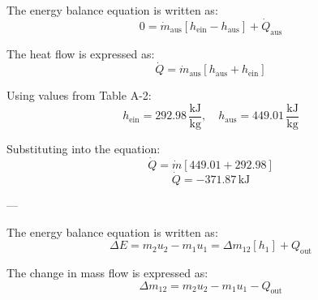 The energy balance equation is written as:  
\[
0 = \dot{m}_{\text{aus}} \left[ h_{\text{ein}} - h_{\text{aus}} \right] + \dot{Q}_{\text{aus}}
\]  

The heat flow is expressed as:  
\[
\dot{Q} = \dot{m}_{\text{aus}} \left[ h_{\text{aus}} + h_{\text{ein}} \right]
\]  

Using values from Table A-2:  
\[
h_{\text{ein}} = 292.98 \, \frac{\text{kJ}}{\text{kg}}, \quad h_{\text{aus}} = 449.01 \, \frac{\text{kJ}}{\text{kg}}
\]  

Substituting into the equation:  
\[
\dot{Q} = \dot{m} \left[ 449.01 + 292.98 \right]
\]  
\[
\dot{Q} = -371.87 \, \text{kJ}
\]  

---

The energy balance equation is written as:  
\[
\Delta E = m_2 u_2 - m_1 u_1 = \Delta m_{12} \left[ h_1 \right] + Q_{\text{out}}
\]  

The change in mass flow is expressed as:  
\[
\Delta m_{12} = m_2 u_2 - m_1 u_1 - Q_{\text{out}}
\]